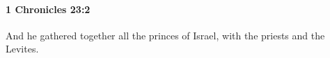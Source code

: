 
		\paragraph{1 Chronicles 23:2} %
			\label{1CHRONICLES-23-2}

			And he gathered together all the princes of Israel, with the priests and the Levites.


